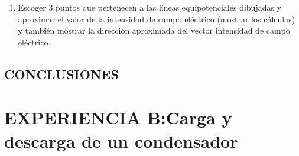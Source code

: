 \documentclass[10pt, twoside]{article}
\begin{document}
\begin{enumerate}[label=\roman*]
\begin{align*}
			r_{2-} &= |<-12;6.5>-<5;-10>|U\\
			r_{2-} &= |<-17;16.5>|U\\
			r_{2-} &= \sqrt{17^2+16.5^2}U\\
			r_{2-} &= 23.69U\\
			r_{2-} &= 14.21m*10^{-2}\\
			\\
			r_{2+} &= |P_+-P_2| \\
			r_{2+} &= |<10;0>-<5;-10>|U\\
			r_{2+} &= |<5;10>|U\\
			r_{2+} &= 11.18U\\
			r_{2+} &= 6.70m*10^{-2}
			\intertext{Reemplazando}
			Q_- &=
			\frac
			{
				4.5V k*15.36m*10^{-2} * \left(\frac{7.44m*\cancel{10^{-2}} }{6.70m*\cancel{10^{-2}} }
				-1 \right)
			}
			{
				k_0 \left(\frac{7.44m*\cancel{10^{-2}} }{6.70m*\cancel{10^{-2}} } -
				\frac{1}{14.21m*10^{-2}} \right)
			}\\
			Q_- &=
			\frac
			{
				4.5V 80 *15.36m*10^{-2} * \left(\frac{7.44}{6.70}
				-1 \right)
			}
			{
				9*10^9* \frac{Nm^2}{C} \left(\frac{7.44}{6.70} -
				\frac{100}{14.21m} \right)
			}\\
			Q_- &=
			\frac
			{
				4.5 * 80* 9*10^{-11}* 15.36 * 0.11
			}
			{
				-47.41
			}C\\
			Q_- &= -1.15C*10^{-9}
			\\
			\frac{Q_+}{r_{2+}} &= 4.5V\frac{k}{k_0}-\frac{Q_-}{r_{2-}} \\
			\frac{Q_+}{6.70m*10^{-2}} &=
			4.5V\frac{80}{9*10^9 \frac{Nm^2}{C} }-\frac{-1.15C*10^{-9}}{14.21m*10^{-2}} \\
			Q_+ &=
			6.70*10^{-2}
			(40*10^{-9}+ 8.09*10^{-9})C \\
			Q_+ &=
			3.22C*10^{-9}
		\end{align*}
	\item Escoger $3$ puntos que pertenecen a las líneas equipotenciales
		dibujadas y aproximar el valor de la intensidad de campo
		eléctrico (mostrar los cálculos) y también mostrar la dirección
		aproximada del vector intensidad de campo eléctrico.
\end{enumerate}

\subsection{CONCLUSIONES}%

\newpage
\section{EXPERIENCIA B:Carga y descarga de un condensador}%
\end{document}
